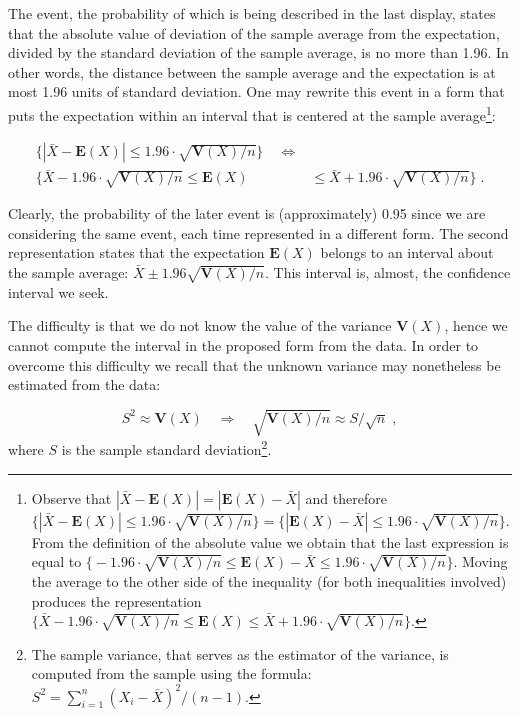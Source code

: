 \documentclass[]{krantz}
\newcommand{\Expec}{\mathbf{E}}
\newcommand{\Var}{\mathbf{V}}
\theoremstyle{definition}
\theoremstyle{definition}
\theoremstyle{definition}
\theoremstyle{remark}
\begin{document}
The event, the probability of which is being described in the last
display, states that the absolute value of deviation of the sample
average from the expectation, divided by the standard deviation of the
sample average, is no more than 1.96. In other words, the distance
between the sample average and the expectation is at most 1.96 units of
standard deviation. One may rewrite this event in a form that puts the
expectation within an interval that is centered at the sample
average\footnote{Observe that \(|\bar X - \Expec(X)| = |\Expec(X) -\bar X |\) and
  therefore
  \(\big\{|\bar X - \Expec(X)| \leq 1.96 \cdot \sqrt{\Var(X)/n} \big\} =\big\{| \Expec(X)-\bar X | \leq 1.96 \cdot \sqrt{\Var(X)/n} \big\}\).
  From the definition of the absolute value we obtain that the last
  expression is equal to
  \(\big\{-1.96 \cdot \sqrt{\Var(X)/n} \leq \Expec(X)-\bar X \leq 1.96 \cdot \sqrt{\Var(X)/n} \big\}\).
  Moving the average to the other side of the inequality (for both
  inequalities involved) produces the representation
  \(\big\{\bar X-1.96 \cdot \sqrt{\Var(X)/n} \leq \Expec(X)\leq \bar X + 1.96 \cdot \sqrt{\Var(X)/n} \big\}\).}:

\[\begin{aligned}
\Big\{|\bar X - \Expec(X)| \leq 1.96 \cdot \sqrt{\Var(X)/n} \Big\} \quad \Longleftrightarrow & \\
 \Big\{ \bar X -1.96 \cdot\sqrt{\Var(X)/n} \leq  \Expec(X) &\leq \bar X + 1.96 \cdot \sqrt{\Var(X)/n}\Big\}\;.\end{aligned}\]

Clearly, the probability of the later event is (approximately) 0.95
since we are considering the same event, each time represented in a
different form. The second representation states that the expectation
\(\Expec(X)\) belongs to an interval about the sample average:
\(\bar X \pm 1.96 \sqrt{\Var(X)/n}\). This interval is, almost, the
confidence interval we seek.

The difficulty is that we do not know the value of the variance
\(\Var(X)\), hence we cannot compute the interval in the proposed form
from the data. In order to overcome this difficulty we recall that the
unknown variance may nonetheless be estimated from the data:

\[S^2 \approx \Var(X) \quad \Longrightarrow \quad \sqrt{\Var(X)/n} \approx S/\sqrt{n}\;,\]
where \(S\) is the sample standard deviation\footnote{The sample variance, that serves as the estimator of the variance,
  is computed from the sample using the formula:
  \(S^2 = \sum_{i=1}^n (X_i-\bar X)^2/(n-1)\).}.
\end{document}
